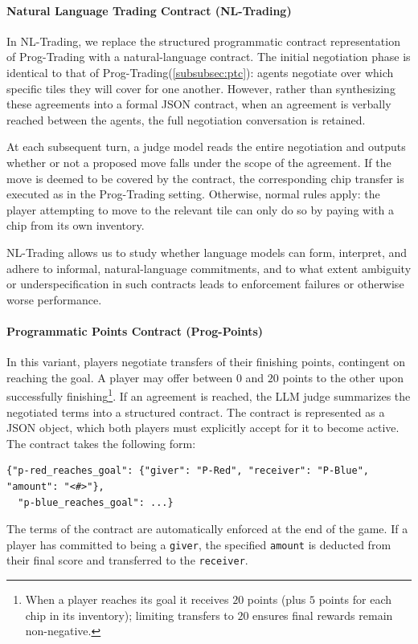 \documentclass{article} %
\newcommand{\PTC}{Prog-Trading\xspace}
\newcommand{\NLTC}{NL-Trading\xspace}
\newcommand{\PPC}{Prog-Points\xspace}
\begin{document}
\paragraph{Natural Language Trading Contract (\NLTC)}
\label{subsubsec:nltc}
In \NLTC, we replace the structured programmatic contract representation of \PTC with a natural-language contract. The initial negotiation phase is identical to that of \PTC  (\ref{subsubsec:ptc}): agents negotiate over which specific tiles they will cover for one another. However, rather than synthesizing these agreements into a formal JSON contract, when an agreement is verbally reached between the agents, the full negotiation conversation is retained. 

At each subsequent turn, a judge model reads the entire negotiation and outputs whether or not a proposed move falls under the scope of the agreement. If the move is deemed to be covered by the contract, the corresponding chip transfer is executed as in the \PTC setting. Otherwise, normal rules apply: the player attempting to move to the relevant tile can only do so by paying with a chip from its own inventory. 

\NLTC allows us to study whether language models can form, interpret, and adhere to informal, natural-language commitments, and to what extent ambiguity or underspecification in such contracts leads to enforcement failures or otherwise worse performance.


\paragraph{Programmatic Points Contract (\PPC)}
\label{subsubsec:strict_c4f}
In this variant, players negotiate transfers of their finishing points, contingent on reaching the goal. A player may offer between $0$ and $20$ points to the other upon successfully finishing\footnote{When a player reaches its goal it receives $20$ points (plus $5$ points for each chip in its inventory); limiting transfers to $20$ ensures final rewards remain non-negative.}. If an agreement is reached, the LLM judge summarizes the negotiated terms into a structured contract. The contract is represented as a JSON object, which both players must explicitly accept for it to become active. The contract takes the following form:
%
\begin{small}
\begin{verbatim}
{"p-red_reaches_goal": {"giver": "P-Red", "receiver": "P-Blue", "amount": "<#>"},
  "p-blue_reaches_goal": ...}
\end{verbatim}
\end{small}
%
The terms of the contract are automatically enforced at the end of the game. If a player has committed to being a \texttt{giver}, the specified \texttt{amount} is deducted from their final score and transferred to the \texttt{receiver}.
\end{document}
